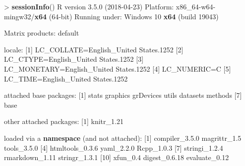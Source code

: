 \documentclass[]{article}
\newenvironment{Shaded}{\begin{snugshade}}{\end{snugshade}}
\newcommand{\KeywordTok}[1]{\textcolor[rgb]{0.13,0.29,0.53}{\textbf{{#1}}}}
\newcommand{\DecValTok}[1]{\textcolor[rgb]{0.00,0.00,0.81}{{#1}}}
\newcommand{\FloatTok}[1]{\textcolor[rgb]{0.00,0.00,0.81}{{#1}}}
\newcommand{\StringTok}[1]{\textcolor[rgb]{0.31,0.60,0.02}{{#1}}}
\newcommand{\NormalTok}[1]{{#1}}
\begin{document}
\begin{Shaded}
\begin{Highlighting}[]
\NormalTok{>}\StringTok{ }\KeywordTok{sessionInfo}\NormalTok{()}
\NormalTok{R version }\FloatTok{3.5.0} \NormalTok{(}\DecValTok{2018-04-23}\NormalTok{)}
\NormalTok{Platform:}\StringTok{ }\NormalTok{x86_64-w64-mingw32/}\KeywordTok{x64} \NormalTok{(}\DecValTok{64}\NormalTok{-bit)}
\NormalTok{Running under:}\StringTok{ }\NormalTok{Windows }\DecValTok{10} \KeywordTok{x64} \NormalTok{(build }\DecValTok{19043}\NormalTok{)}

\NormalTok{Matrix products:}\StringTok{ }\NormalTok{default}

\NormalTok{locale:}
\NormalTok{[}\DecValTok{1}\NormalTok{] LC_COLLATE=English_United States}\FloatTok{.1252} 
\NormalTok{[}\DecValTok{2}\NormalTok{] LC_CTYPE=English_United States}\FloatTok{.1252}   
\NormalTok{[}\DecValTok{3}\NormalTok{] LC_MONETARY=English_United States}\FloatTok{.1252}
\NormalTok{[}\DecValTok{4}\NormalTok{] LC_NUMERIC=C                          }
\NormalTok{[}\DecValTok{5}\NormalTok{] LC_TIME=English_United States}\FloatTok{.1252}    

\NormalTok{attached base packages:}
\NormalTok{[}\DecValTok{1}\NormalTok{] stats     graphics  grDevices utils     datasets  methods  }
\NormalTok{[}\DecValTok{7}\NormalTok{] base     }

\NormalTok{other attached packages:}
\NormalTok{[}\DecValTok{1}\NormalTok{] knitr_1}\FloatTok{.21}

\NormalTok{loaded via a }\KeywordTok{namespace} \NormalTok{(and not attached):}
\StringTok{ }\NormalTok{[}\DecValTok{1}\NormalTok{] compiler_3}\FloatTok{.5.0}  \NormalTok{magrittr_1}\FloatTok{.5}    \NormalTok{tools_3}\FloatTok{.5.0}    
 \NormalTok{[}\DecValTok{4}\NormalTok{] htmltools_0}\FloatTok{.3.6} \NormalTok{yaml_2}\FloatTok{.2.0}      \NormalTok{Rcpp_1}\FloatTok{.0.3}     
 \NormalTok{[}\DecValTok{7}\NormalTok{] stringi_1}\FloatTok{.2.4}   \NormalTok{rmarkdown_1}\FloatTok{.11}  \NormalTok{stringr_1}\FloatTok{.3.1}  
\NormalTok{[}\DecValTok{10}\NormalTok{] xfun_0}\FloatTok{.4}        \NormalTok{digest_0}\FloatTok{.6.18}   \NormalTok{evaluate_0}\FloatTok{.12}  
\end{Highlighting}
\end{Shaded}
\end{document}
